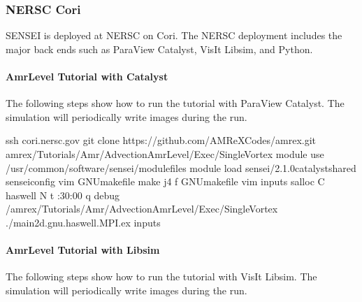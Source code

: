 \documentclass[letterpaper,10pt,english]{sphinxmanual}
\begin{document}
\subsubsection{NERSC Cori}
\label{\detokenize{Visualization:nersc-cori}}
\sphinxAtStartPar
SENSEI is deployed at NERSC on Cori. The NERSC deployment includes the major
back ends such as ParaView Catalyst, VisIt Libsim, and Python.


\paragraph{AmrLevel Tutorial with Catalyst}
\label{\detokenize{Visualization:amrlevel-tutorial-with-catalyst}}
\sphinxAtStartPar
The following steps show how to run the tutorial with ParaView Catalyst. The
simulation will periodically write images during the run.

\begin{sphinxVerbatim}[commandchars=\\\{\}]
ssh cori.nersc.gov
 
git clone https://github.com/AMReX\PYGZhy{}Codes/amrex.git
 amrex/Tutorials/Amr/Advection\PYGZus{}AmrLevel/Exec/SingleVortex
module use /usr/common/software/sensei/modulefiles
module load sensei/2.1.0\PYGZhy{}catalyst\PYGZhy{}shared
 sensei\PYGZus{}config
vim GNUmakefile
make \PYGZhy{}j4 \PYGZhy{}f GNUmakefile
vim inputs
salloc \PYGZhy{}C haswell \PYGZhy{}N  \PYGZhy{}t :30:00 \PYGZhy{}q debug
 /amrex/Tutorials/Amr/Advection\PYGZus{}AmrLevel/Exec/SingleVortex
./main2d.gnu.haswell.MPI.ex inputs
\end{sphinxVerbatim}


\paragraph{AmrLevel Tutorial with Libsim}
\label{\detokenize{Visualization:amrlevel-tutorial-with-libsim}}
\sphinxAtStartPar
The following steps show how to run the tutorial with VisIt Libsim. The
simulation will periodically write images during the run.
\end{document}

